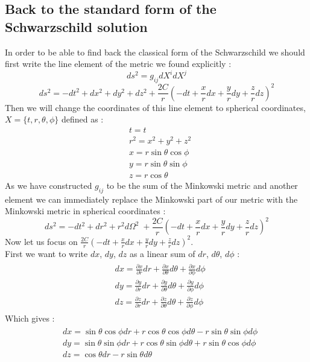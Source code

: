\documentclass[a4paper,12pt]{article}
\theoremstyle{definition}
\begin{document}
\subsection{Back to the standard form of the Schwarzschild solution}
In order to be able to find back the classical form of the Schwarzschild we should first write the line element of the metric we found explicitly :
\begin{equation}
	ds^2=g_{ij}dX^idX^j
\end{equation}
\begin{equation}
	ds^2=-dt^2+dx^2+dy^2+dz^2+\frac{2C}{r}(-dt+\frac{x}{r}dx+\frac{y}{r}dy+\frac{z}{r}dz)^2
\end{equation}
Then we will change the coordinates of this line element to spherical coordinates, $X=\{t,r,\theta,\phi\}$ defined as :
\begin{align}
	&t=t\\
	&r^2=x^2+y^2+z^2\\
	&x=r\sin{\theta}\cos{\phi}\label{coord-transform-1}\\
	&y=r\sin{\theta}\sin{\phi}\\
	&z=r\cos{\theta}\label{coord-transform-3}
\end{align}
As we have constructed $g_{ij}$ to be the sum of the Minkowski metric and another element we can immediately replace the Minkowski part of our metric with the Minkowski metric in spherical coordinates :
\begin{equation} \label{line-elem-schwarz}
	ds^2=-dt^2+dr^2+r^2d\Omega^2\;+\frac{2C}{r}(-dt+\frac{x}{r}dx+\frac{y}{r}dy+\frac{z}{r}dz)^2
\end{equation} 
Now let us focus on $\frac{2C}{r}(-dt+\frac{x}{r}dx+\frac{y}{r}dy+\frac{z}{r}dz)^2$.\\
First we want to write $dx$, $dy$, $dz$ as a linear sum of $dr$, $d\theta$, $d\phi$ :
\begin{align}
\begin{split}
	&dx=\frac{\partial x}{\partial r}dr+\frac{\partial x}{\partial \theta}d\theta+\frac{\partial x}{\partial \phi}d\phi\\
	&dy=\frac{\partial y}{\partial r}dr+\frac{\partial y}{\partial \theta}d\theta+\frac{\partial y}{\partial \phi}d\phi\\
	&dz=\frac{\partial z}{\partial r}dr+\frac{\partial z}{\partial \theta}d\theta+\frac{\partial z}{\partial \phi}d\phi
\end{split}
\end{align}
Which gives :
\begin{align}
\begin{split}
	&dx=\sin{\theta}\cos{\phi}dr+r\cos{\theta}\cos{\phi}d\theta-r\sin{\theta}\sin{\phi}d\phi \\
	&dy=\sin{\theta}\sin{\phi}dr+r\cos{\theta}\sin{\phi}d\theta+r\sin{\theta}\cos{\phi}d\phi \\
	&dz=\cos{\theta}dr-r\sin{\theta}d\theta
\end{split}
\end{align}
\end{document}
